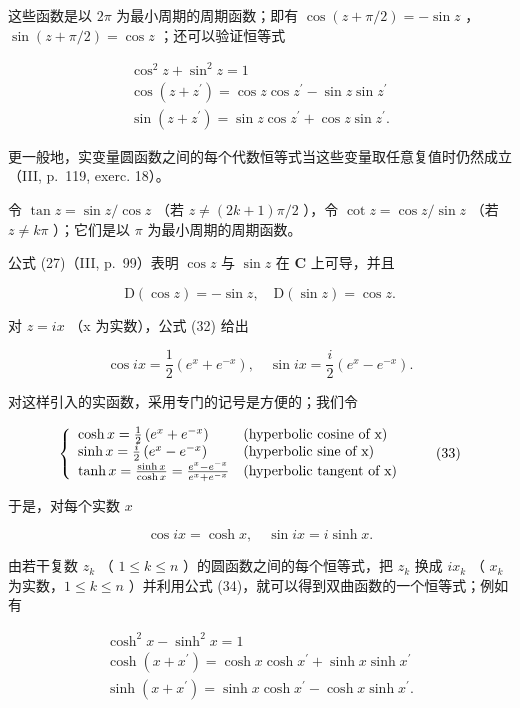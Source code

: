 这些函数是以 \(2\pi\) 为最小周期的周期函数；即有 \(\cos(z + \pi/2) = -\sin z\) ，\(\sin(z + \pi/2) = \cos z\) ；还可以验证恒等式

\[
\begin{array}{c} \cos^ {2} z + \sin^ {2} z = 1 \\ \cos (z + z ^ {\prime}) = \cos z \cos z ^ {\prime} - \sin z \sin z ^ {\prime} \\ \sin (z + z ^ {\prime}) = \sin z \cos z ^ {\prime} + \cos z \sin z ^ {\prime}. \end{array}
\]

更一般地，实变量圆函数之间的每个代数恒等式当这些变量取任意复值时仍然成立（III, p.~119, exerc. 18）。

令 \(\tan z = \sin z/\cos z\) （若 \(z \neq (2k + 1)\pi/2\) ），令 \(\cot z = \cos z/\sin z\) （若 \(z \neq k\pi\) ）；它们是以 \(\pi\) 为最小周期的周期函数。

公式 (27)（III, p.~99）表明 \(\cos z\) 与 \(\sin z\) 在 \(\mathbf{C}\) 上可导，并且

\[
\mathrm{D} (\cos z) = - \sin z, \quad \mathrm{D} (\sin z) = \cos z.
\]

对 \(z = ix\) （x 为实数），公式 (32) 给出

\[
\cos i x = \frac {1}{2} \left(e ^ {x} + e ^ {- x}\right), \quad \sin i x = \frac {i}{2} \left(e ^ {x} - e ^ {- x}\right).
\]

对这样引入的实函数，采用专门的记号是方便的；我们令

\[
\left\{ \begin{array}{l l} \cosh x = \frac {1}{2} \left(e ^ {x} + e ^ {- x}\right) & \text {(hyperbolic cosine of x)} \\ \sinh x = \frac {i}{2} \left(e ^ {x} - e ^ {- x}\right) & \text {(hyperbolic sine of x)} \\ \tanh x = \frac {\sinh x}{\cosh x} = \frac {e ^ {x} - e ^ {- x}}{e ^ {x} + e ^ {- x}} & \text {(hyperbolic tangent of x)} \end{array} \right.\tag{33}
\]

于是，对每个实数 \(x\)

\[
\cos i x = \cosh x, \quad \sin i x = i \sinh x.\tag{34}
\]

由若干复数 \(z_{k}\) （ \(1 \leqslant k \leqslant n\) ）的圆函数之间的每个恒等式，把 \(z_{k}\) 换成 \(ix_{k}\) （ \(x_{k}\) 为实数，\(1 \leqslant k \leqslant n\) ）并利用公式 (34)，就可以得到双曲函数的一个恒等式；例如有

\[
\begin{array}{c} \cosh^ {2} x - \sinh^ {2} x = 1 \\ \cosh (x + x ^ {\prime}) = \cosh x \cosh x ^ {\prime} + \sinh x \sinh x ^ {\prime} \\ \sinh (x + x ^ {\prime}) = \sinh x \cosh x ^ {\prime} - \cosh x \sinh x ^ {\prime}. \end{array}
\]

